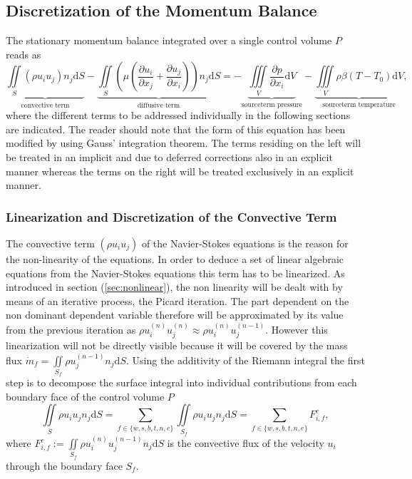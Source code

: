   \subsection{Discretization of the Momentum Balance}
  \label{sec:segdiscretization}

      The stationary momentum balance integrated over a single control volume \(P\) reads as
      \begin{equation}
        \label{eq:semidiscrete}
        \underbrace{\iint\limits_S (\rho u_i u_j)n_j \mathrm{d}S}_{\text{convective term}}
        - \underbrace{\iint\limits_S \left(\mu \left( \frac{\partial u_i}{\partial x_j} + \frac{\partial u_j}{\partial x_i}\right)\right)n_j \mathrm{d}S}_{\text{diffusive term}}
        = - \underbrace{\iiint\limits_V \frac{\partial p}{\partial x_i} \mathrm{d}V}_{\text{sourceterm pressure}}
        - \underbrace{\iiint\limits_V \rho \beta \left(T - T_0\right) \mathrm{d}V}_{\text{sourceterm temperature}},
      \end{equation}
      where the different terms to be addressed individually in the following sections are indicated. The reader should note that the form of this equation has been modified by using Gauss' integration theorem. The terms residing on the left will be treated in an implicit and due to deferred corrections also in an explicit manner whereas the terms on the right will be treated exclusively in an  explicit manner.

      \subsubsection{Linearization and Discretization of the Convective Term}

      The convective term \(\left( \rho u_i u_j \right)\) of the Navier-Stokes equations is the reason for the non-linearity of the equations. In order to deduce a set of linear algebraic equations from the Navier-Stokes equations this term has to be linearized. As introduced in section (\ref{sec:nonlinear}), the non linearity will be dealt with by means of an iterative process, the Picard iteration. The part dependent on the non dominant dependent variable therefore will be approximated by its value from the previous iteration as \( \rho u_i^{(n)} u_j^{(n)} \approx \rho u_i^{(n)} u_j^{(n-1)} \). However this linearization will not be directly visible because it will be covered by the mass flux \(\dot{m}_f = \iint\limits_{S_f} \rho u_j^{(n-1)} n_j \mathrm{d}S \). Using the additivity of the Riemann integral the first step is to decompose the surface integral into individual contributions from each boundary face of the control volume \(P\)
      \begin{displaymath}
      \iint\limits_S \rho u_i u_jn_j \mathrm{d}S
      = \sum_{f \in \{w,s,b,t,n,e\}} \iint\limits_{S_f}\rho u_{i} u_{j} n_{j} \mathrm{d}S
      = \sum_{f \in \{w,s,b,t,n,e\}} F_{i,f}^{c},
      \end{displaymath}
      where \(F_{i,f}^c := \iint\limits_{S_f} \rho u_{i}^{(n)} u_{j}^{(n-1)} n_{j} \mathrm{d}S \) is the convective flux of the velocity \(u_i\) through the boundary face \(S_f\). 
      
